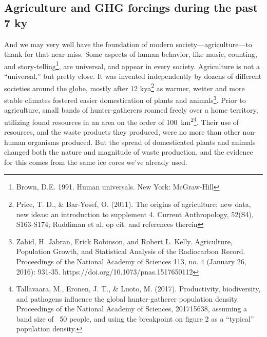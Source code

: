 \subsection{Agriculture and GHG forcings during the past 7 ky}\label{Ag_GHG}
And we may very well have the foundation of modern society---agriculture---to thank for that near miss. Some aspects of human behavior, like music, counting, and story-telling\footnote{Brown, D.E. 1991. Human universals. New York: McGraw-Hill}, are universal, and appear in every society. Agriculture is not a ``universal,'' but pretty close. It was invented independently by dozens of different societies around the globe, mostly after 12 kya\footnote{Price, T. D., \& Bar-Yosef, O. (2011). The origins of agriculture: new data, new ideas: an introduction to supplement 4. Current Anthropology, 52(S4), S163-S174; Ruddiman et al. op cit. and references therein} as warmer, wetter and more stable climates fostered easier domestication of plants and animals\footnote{Zahid, H. Jabran, Erick Robinson, and Robert L. Kelly. Agriculture, Population Growth, and Statistical Analysis of the Radiocarbon Record. Proceedings of the National Academy of Sciences 113, no. 4 (January 26, 2016): 931-35. https://doi.org/10.1073/pnas.1517650112  }. Prior to agriculture, small bands of hunter-gatherers roamed freely over a home territory, utilizing found resources in an area on the order of \SI{100}{\square\kilo\metre}\footnote{Tallavaara, M., Eronen, J. T., \& Luoto, M. (2017). Productivity, biodiversity, and pathogens influence the global hunter-gatherer population density. Proceedings of the National Academy of Sciences, 201715638, assuming a band size of ~50 people, and using the breakpoint on figure 2 as a ``typical'' population density.}. Their use of resources, and the waste products they produced, were no more than other non-human organisms produced. But the spread of domesticated plants and animals changed both the nature and magnitude of waste production, and the evidence for this comes from the same ice cores we've already used.\\

